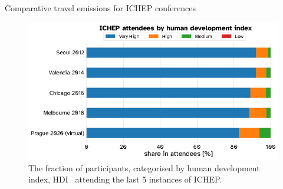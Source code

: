 \documentclass[../SustainableHEP.tex]{subfiles}
\begin{document}
\begin{casestudy}{Comparative travel emissions for ICHEP conferences}

\begin{figure}
    \centering
    \captionsetup{type=figure}
    \includegraphics[width=1.\textwidth]{Sections/Figs/Travel/ICHEP_attendees.png}
    \caption[ICHEP participants by development index]%
        {The fraction of participants, categorised by human development index, HDI~\cite{hdiref} attending the last 5 instances of ICHEP.\label{fig:DevelopmentIndex}}
\end{figure}


\end{casestudy}

\end{document}
